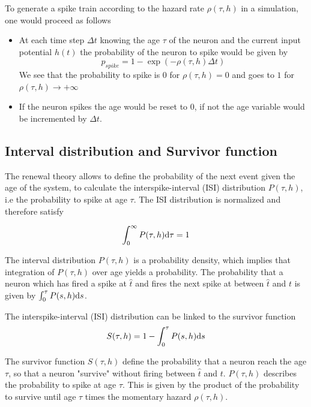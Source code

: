\documentclass[12pt,twoside]{report}
\def \dd  {{\rm d}}
\begin{document}
To generate a spike train according to the hazard rate $\rho(\tau,h)$ in a simulation, one would proceed as follows
\begin{itemize}
\item At each time step $\Delta t$ knowing the age $\tau$ of the neuron and the current input potential $h(t)$ the probability of the neuron to spike would be given by \begin{equation}
p_{spike}=1-\exp(-\rho(\tau,h)\Delta t)
\end{equation} We see that the probability to spike is $0$ for $\rho(\tau,h)=0$ and goes to $1$ for $\rho(\tau,h)\rightarrow +\infty$
\item If the neuron spikes the age would be reset to $0$, if not the age variable would be incremented by $\Delta t$. 
\end{itemize}




\subsection{Interval distribution and Survivor function}

The renewal theory allows to define the probability of the next event given the age of the system, to calculate the interspike-interval (ISI) distribution $P(\tau,h)$, i.e the probability to spike at age $\tau$. The ISI distribution is normalized and therefore satisfy

\begin{equation}
\label{eq:Pnorm}
\int_0^\infty P(\tau,h)\dd\tau=1 
\end{equation}

The interval distribution $P(\tau,h)$ is a probability density, which implies that integration of $P(\tau,h)$ over age yields a probability. The probability that a neuron which has fired a spike at $\hat{t}$ and fires the next spike at between $\hat{t}$ and $t$ is given by $\int_0^\tau P(s,h) \dd s$.

The interspike-interval (ISI) distribution can be linked to the survivor function
\begin{equation}
\label{eq:S1}
S(\tau,h)=1-\int_0^\tau P(s,h) \dd s
\end{equation}

The survivor function $S(\tau,h)$ define the probability that a neuron reach the age $\tau$, so that a neuron "survive" without firing between $\hat{t}$ and $t$. $P(\tau,h)$ describes the probability to spike at age $\tau$. This is given by the product of the probability to survive until age $\tau$ times the momentary hazard $\rho(\tau,h)$. 
\end{document}
